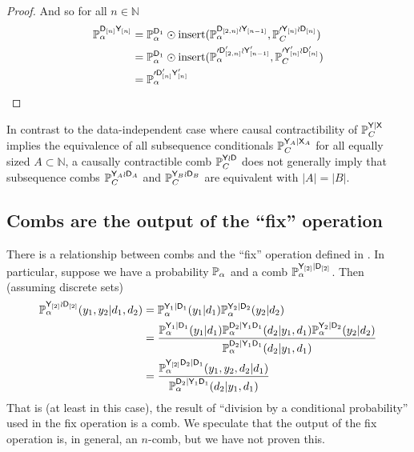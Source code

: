 \begin{proof}
And so for all $n\in \mathbb{N}$
\begin{align}
    \mathbb{P}_\alpha^{\mathsf{D}_{[n]} \mathsf{Y}_{[n]}} &=  \mathbb{P}_\alpha^{\mathsf{D}_1}\odot \text{insert}(\mathbb{P}_\alpha^{ \mathsf{D}_{[2,n]}\wr\mathsf{Y}_{[n-1]}}, \mathbb{P}_C^{\prime \mathsf{Y}_{[n]}\wr\mathsf{D}_{[n]}}) \\
    &= \mathbb{P}_\alpha^{\mathsf{D}_1}\odot \text{insert}(\mathbb{P}_\alpha^{\prime \mathsf{D}'_{[2,n]}\wr\mathsf{Y}'_{[n-1]}}, \mathbb{P}_C^{\prime \mathsf{Y}'_{[n]}\wr\mathsf{D}'_{[n]}}) \\
    &= \mathbb{P}_\alpha^{\prime\mathsf{D}'_{[n]} \mathsf{Y}'_{[n]}}
\end{align}
\end{proof}

In contrast to the data-independent case where causal contractibility of $\mathbb{P}_C^{\mathsf{Y}|\mathsf{X}}$ implies the equivalence of all subsequence conditionals $\mathbb{P}_C^{\mathsf{Y}_A|\mathsf{X}_A}$ for all equally sized $A\subset\mathbb{N}$, a causally contractible comb $\mathbb{P}_C^{\mathsf{Y}\wr \mathsf{D}}$ does not generally imply that subsequence combs $\mathbb{P}_C^{\mathsf{Y}_A\wr \mathsf{D}_A}$ and $\mathbb{P}_C^{\mathsf{Y}_B\wr \mathsf{D}_B}$ are equivalent with $|A|=|B|$.


\subsection{Combs are the output of the ``fix'' operation}

There is a relationship between combs and the ``fix'' operation defined in \citet{richardson_nested_2017}. In particular, suppose we have a probability $\mathbb{P}_\alpha$ and a comb $\mathbb{P}_\alpha^{\mathsf{Y}_{[2]}|\mathsf{D}_{[2]}}$. Then (assuming discrete sets)
\begin{align}
    \mathbb{P}_\alpha^{\mathsf{Y}_{[2]}\wr \mathsf{D}_{[2]}}(y_1,y_2|d_1,d_2) &= \mathbb{P}_\alpha^{\mathsf{Y}_1|\mathsf{D}_1}(y_1|d_1)\mathbb{P}_\alpha^{\mathsf{Y}_2|\mathsf{D}_2}(y_2|d_2)\\
    &= \frac{\mathbb{P}_\alpha^{\mathsf{Y}_1|\mathsf{D}_1}(y_1|d_1)\mathbb{P}_\alpha^{\mathsf{D}_2|\mathsf{Y}_1\mathsf{D}_1}(d_2|y_1,d_1)\mathbb{P}_\alpha^{\mathsf{Y}_2|\mathsf{D}_2}(y_2|d_2)}{\mathbb{P}_\alpha^{\mathsf{D}_2|\mathsf{Y}_1\mathsf{D}_1}(d_2|y_1,d_1)}\\
    &= \frac{\mathbb{P}_\alpha^{\mathsf{Y}_{[2]}\mathsf{D}_2|\mathsf{D}_1}(y_1,y_2,d_2|d_1)}{\mathbb{P}_\alpha^{\mathsf{D}_2|\mathsf{Y}_1\mathsf{D}_1}(d_2|y_1,d_1)}
\end{align}
That is (at least in this case), the result of ``division by a conditional probability'' used in the fix operation is a comb. We speculate that the output of the fix operation is, in general, an $n$-comb, but we have not proven this.


